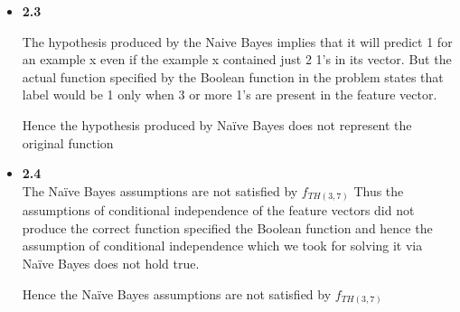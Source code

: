 \documentclass[11pt]{article}
\begin{document}
\begin{itemize}
\item[] \textbf{ 2.3}

The hypothesis produced by the Naive Bayes implies that it will predict 1 for an example x even if the example x contained just 2 1's in its vector. But the actual function specified by the Boolean function in the problem states that label would be 1 only when 3 or more 1's are present in the feature vector.

Hence the hypothesis produced by Na\"ive Bayes does not represent the original function

\item[] \textbf{ 2.4}\\

 The Na\"ive Bayes assumptions  are not satisfied by $f_{TH(3,7)}$
Thus the assumptions of conditional independence of the feature vectors did not produce the correct function specified the Boolean function and hence the assumption of conditional independence which we took for solving it via Na\"ive Bayes does not hold true. 

Hence the  Na\"ive Bayes assumptions  are not satisfied by $f_{TH(3,7)}$

\end{itemize}
\end{document}
